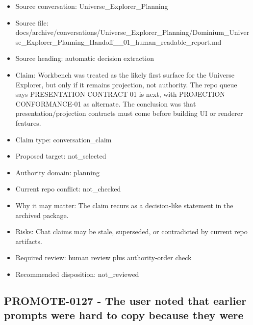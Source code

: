 \documentclass[11pt,a4paper]{report}
\begin{document}
\begin{itemize}
\item Source conversation: Universe\_Explorer\_Planning
\item Source file: docs/archive/conversations/Universe\_Explorer\_Planning/Dominium\_Universe\_Explorer\_Planning\_Handoff\_\_01\_human\_readable\_report.md
\item Source heading: automatic decision extraction
\item Claim: Workbench was treated as the likely first surface for the Universe Explorer, but only if it remains projection, not authority. The repo queue says PRESENTATION-CONTRACT-01 is next, with PROJECTION-CONFORMANCE-01 as alternate. The conclusion was that presentation/projection contracts must come before building UI or renderer features.
\item Claim type: conversation\_claim
\item Proposed target: not\_selected
\item Authority domain: planning
\item Current repo conflict: not\_checked
\item Why it may matter: The claim recurs as a decision-like statement in the archived package.
\item Risks: Chat claims may be stale, superseded, or contradicted by current repo artifacts.
\item Required review: human review plus authority-order check
\item Recommended disposition: not\_reviewed
\end{itemize}

\subsection{PROMOTE-0127 - The user noted that earlier prompts were hard to copy because they were}
\end{document}
